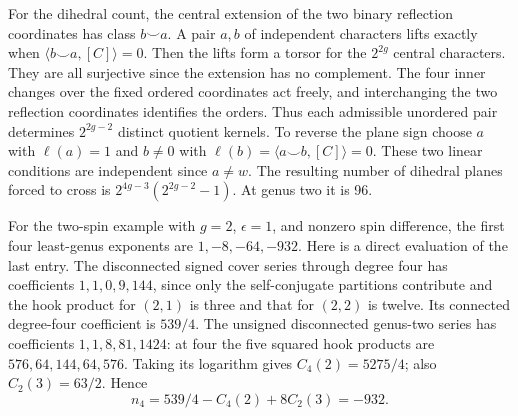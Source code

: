 For the dihedral count, the central extension of the two binary reflection coordinates has class \(b\smile a\). A pair \(a,b\) of independent characters lifts exactly when \(\langle b\smile a,[C]\rangle=0\). Then the lifts form a torsor for the \(2^{2g}\) central characters. They are all surjective since the extension has no complement. The four inner changes over the fixed ordered coordinates act freely, and interchanging the two reflection coordinates identifies the orders. Thus each admissible unordered pair determines \(2^{2g-2}\) distinct quotient kernels. To reverse the plane sign choose \(a\) with \(\ell(a)=1\) and \(b\ne0\) with \(\ell(b)=\langle a\smile b,[C]\rangle=0\). These two linear conditions are independent since \(a\ne w\). The resulting number of dihedral planes forced to cross is \(2^{4g-3}(2^{2g-2}-1)\). At genus two it is 96.


For the two-spin example with $g=2$, $\epsilon=1$, and nonzero spin
difference, the first four least-genus exponents are $1,-8,-64,-932$.
Here is a direct evaluation of the last entry. The disconnected signed
cover series through degree four has coefficients $1,1,0,9,144$, since
only the self-conjugate partitions contribute and the hook product for
$(2,1)$ is three and that for $(2,2)$ is twelve. Its connected degree-four coefficient is $539/4$.
The unsigned disconnected genus-two series has coefficients
$1,1,8,81,1424$: at four the five squared hook products are
$576,64,144,64,576$. Taking its logarithm gives
$C_4(2)=5275/4$; also $C_2(3)=63/2$. Hence
\[
 n_4=539/4-C_4(2)+8C_2(3)=-932 .
\]

